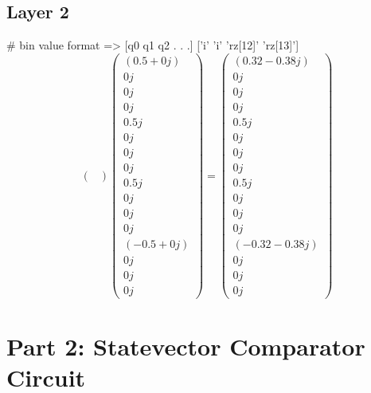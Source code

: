 \documentclass{article}%
\begin{document}
\subsection{Layer 2}%
\label{subsec:Layer2}%
\#  bin value format       => {[}q0 q1 q2 . . .{]}\newline%
%
{[}'i' 'i' 'rz{[}12{]}' 'rz{[}13{]}'{]}%
\[%
\begin{pmatrix}%
%
\end{pmatrix} \begin{pmatrix}%
(0.5+0j)\\%
0j\\%
0j\\%
0j\\%
0.5j\\%
0j\\%
0j\\%
0j\\%
0.5j\\%
0j\\%
0j\\%
0j\\%
(-0.5+0j)\\%
0j\\%
0j\\%
0j%
\end{pmatrix} = \begin{pmatrix}%
(0.32-0.38j)\\%
0j\\%
0j\\%
0j\\%
0.5j\\%
0j\\%
0j\\%
0j\\%
0.5j\\%
0j\\%
0j\\%
0j\\%
(-0.32-0.38j)\\%
0j\\%
0j\\%
0j%
\end{pmatrix}%
\]

%
\section{Part 2: Statevector Comparator Circuit}%
\label{sec:Part2StatevectorComparatorCircuit}%

%
\end{document}
